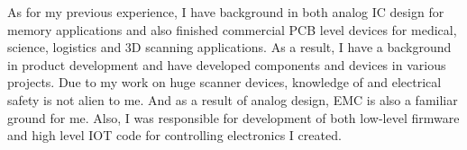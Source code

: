 


As for my previous experience, I have background in both analog IC design for memory applications and also finished commercial PCB level devices for medical, science, logistics and 3D scanning applications. As a result, I have a background in product development and have developed components and devices in various projects.
Due to my work on huge scanner devices, knowledge of and electrical safety is not alien to me. And as a result of analog design, EMC is also a familiar ground for me.
Also, I was responsible for development of both low-level firmware and high level IOT code for controlling electronics I created.
